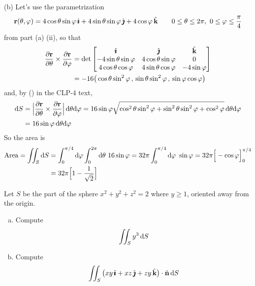 \begin{solution}
(b) Let's use the parametrization
\begin{equation*}
\mathbf{r}(\theta,\varphi) = 4\cos\theta\sin\varphi\,\hat{\pmb{\imath}}
                     +4\sin\theta\sin\varphi\,\hat{\pmb{\jmath}}
                     +4\cos\varphi\,\hat{\mathbf{k}}\qquad
0\le\theta\le 2\pi,\ 0\le\varphi\le \frac{\pi}{4}
\end{equation*}
from part (a) (ii), 
so that
\begin{align*}
\frac{\partial\mathbf{r}}{\partial\theta}\times\frac{\partial\mathbf{r}}{\partial\varphi}
&= \det\left[\begin{matrix} \hat{\pmb{\imath}} & \hat{\pmb{\jmath}} & \hat{\mathbf{k}} \\
-4\sin\theta\sin\varphi & 4\cos\theta\sin\varphi & 0 \\
4\cos\theta\cos\varphi & 4\sin\theta\cos\varphi & -4\sin\varphi 
             \end{matrix}\right] \\
&= -16\big(\cos\theta\sin^2\varphi\,,\, \sin\theta\sin^2\varphi\,,\,
                    \sin\varphi\cos\varphi\big)
\end{align*}
and, by () in the CLP-4 text,
\begin{align*}
\mathrm{d}S &= \Big|\frac{\partial\mathbf{r}}{\partial\theta}\times
            \frac{\partial\mathbf{r}}{\partial\varphi}\Big|\,\mathrm{d}\theta\mathrm{d}\varphi
= 16\sin\varphi\sqrt{\cos^2\theta\sin^2\varphi
                   + \sin^2\theta\sin^2\varphi
                   +\cos^2\varphi}\,\mathrm{d}\theta\mathrm{d}\varphi  \\
&= 16\sin\varphi\,\mathrm{d}\theta\mathrm{d}\varphi
\end{align*}
So the area is
\begin{align*}
\text{Area}
=\dblInt_S \dee{S}
&=\int_0^{\pi/4}\dee{\varphi}\int_0^{2\pi}\dee{\theta}\ 16\sin\varphi
=32\pi \int_0^{\pi/4}\dee{\varphi}\ \sin\varphi
=32\pi \Big[-\cos\varphi\Big]_0^{\pi/4} \\
&=32\pi\Big[1-\frac{1}{\sqrt{2}}\Big]
\end{align*}
\end{solution}

\begin{question}[M317 2017D] %
Let $S$ be the part of the sphere $x^2+y^2+z^2=2$ where $y\ge 1$, oriented away from the origin.
\begin{enumerate}[(a)]
\item
Compute
\begin{equation*}
\iint_S y^3\,\mathrm{d}S
\end{equation*}

\item
Compute
\begin{equation*}
\iint_S \big(xy\,\hat{\pmb{\imath}} + xz\,\hat{\pmb{\jmath}} + zy\,\hat{\mathbf{k}}\big)\cdot\hat{\mathbf{n}}\,\mathrm{d}S
\end{equation*}
\end{enumerate}
\end{question}

